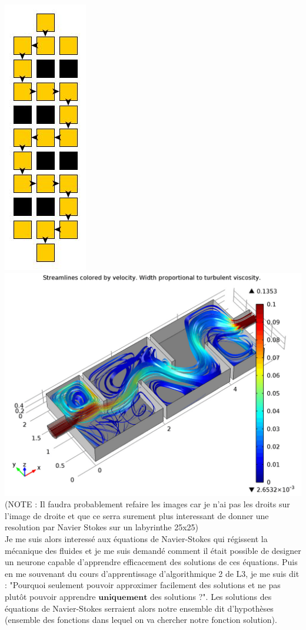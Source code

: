 \documentclass[12pt]{article}
\begin{document}
\includegraphics[scale=0.45]{ex_maze.jpg} \indent\indent
\includegraphics[scale=0.20]{navier.png}\\
(NOTE : Il faudra probablement refaire les images car je n'ai pas les droits sur l'image de droite et que ce serra surement plus interessant de donner une resolution par Navier Stokes sur un labyrinthe 25x25)\\
Je me suis alors interessé aux équations de Navier-Stokes qui régissent la mécanique des fluides et je me suis demandé comment il était possible de designer un neurone capable d'apprendre efficacement des solutions de ces équations. Puis en me souvenant du cours d'apprentissage d'algorithmique 2 de L3, je me suis dit : "Pourquoi seulement pouvoir approximer facilement des solutions et ne pas plutôt pouvoir apprendre $\textbf{uniquement}$ des solutions ?". Les solutions des équations de Navier-Stokes serraient alors notre ensemble dit d'hypothèses (ensemble des fonctions dans lequel on va chercher notre fonction solution).
\end{document}

